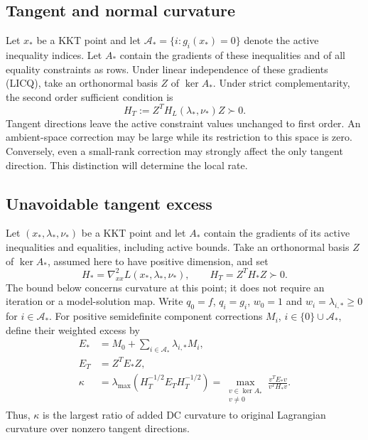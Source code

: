 \documentclass[pdflatex,sn-mathphys-num]{sn-jnl}
\theoremstyle{thmstyleone}
\theoremstyle{thmstylethree}
\newcounter{algorithm}
\newcommand{\cA}{\mathcal A}
\begin{document}
\subsection{Tangent and normal curvature}
Let $x_*$ be a KKT point and let $\cA_*=\{i:g_i(x_*)=0\}$ denote
the active inequality indices. Let $A_*$ contain the gradients of these
inequalities and of all equality constraints as rows. Under
linear independence of these gradients (LICQ), take an orthonormal basis
$Z$ of $\ker A_*$. Under strict complementarity, the second order
sufficient condition is
\begin{equation}\label{eq:sosc}
 H_T:=Z^TH_L(\lambda_*,\nu_*)Z\succ0.
\end{equation}
Tangent directions leave the active constraint values unchanged to first order.
An ambient-space correction may be large while its restriction to this
space is zero. Conversely, even a small-rank correction may strongly
affect the only tangent direction. This distinction will determine the
local rate.


\subsection{Unavoidable tangent excess}
\label{sec:tangent-excess-bound}
Let $(x_*,\lambda_*,\nu_*)$ be a KKT point and let $A_*$ contain the
gradients of its active inequalities and equalities, including active
bounds. Take an orthonormal basis $Z$ of $\ker A_*$, assumed here to
have positive dimension, and set
\[
 H_*=\nabla^2_{xx}L(x_*,\lambda_*,\nu_*),\qquad
 H_T=Z^TH_*Z\succ0.
\]
The bound below concerns curvature at this point; it does not require an
iteration or a model-solution map. Write $q_0=f$, $q_i=g_i$,
$w_0=1$ and $w_i=\lambda_{i,*}\geq0$ for
$i\in\mathcal A_*$. For positive semidefinite component corrections
$M_i$, $i\in\{0\}\cup\mathcal A_*$, define their weighted excess by
\begin{equation}\label{eq:tangent-excess-definition}
 \begin{split}
 E_*&=M_0+\sum_{i\in\mathcal A_*}\lambda_{i,*}M_i,\\
 E_T&=Z^TE_*Z,\\
 \kappa&=\lambda_{\max}(H_T^{-1/2}E_TH_T^{-1/2})
       =\max_{\substack{v\in\ker A_*\\v\ne0}}
          \frac{v^TE_*v}{v^TH_*v}.
 \end{split}
\end{equation}
Thus, $\kappa$ is the largest ratio of added DC curvature to original
Lagrangian curvature over nonzero tangent directions.
\end{document}
